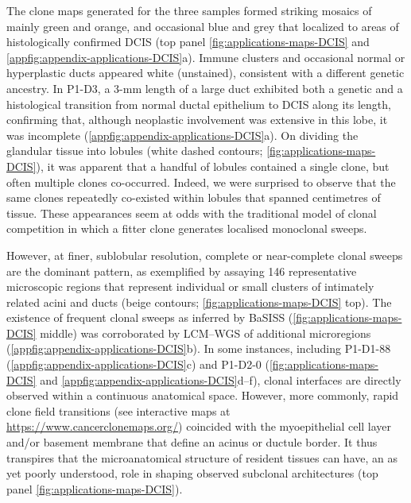 The clone maps generated for the three samples formed striking mosaics of mainly green and orange, and occasional blue and grey that localized to areas of histologically confirmed \ac{DCIS} (top panel \cref{fig:applications-maps-DCIS} and \cref{appfig:appendix-applications-DCIS}a). Immune clusters and occasional normal or hyperplastic ducts appeared white (unstained), consistent with a different genetic ancestry. In P1-D3, a 3-mm length of a large duct exhibited both a genetic and a histological transition from normal ductal epithelium to DCIS along its length, confirming that, although neoplastic involvement was extensive in this lobe, it was incomplete (\cref{appfig:appendix-applications-DCIS}a). On dividing the glandular tissue into lobules (white dashed contours; \cref{fig:applications-maps-DCIS}), it was apparent that a handful of lobules contained a single clone, but often multiple clones co-occurred. Indeed, we were surprised to observe that the same clones repeatedly co-existed within lobules that spanned centimetres of tissue. These appearances seem at odds with the traditional model of clonal competition in which a fitter clone generates localised monoclonal sweeps.


However, at finer, sublobular resolution, complete or near-complete clonal sweeps are the dominant pattern, as exemplified by assaying 146 representative microscopic regions that represent individual or small clusters of intimately related acini and ducts (beige contours; \cref{fig:applications-maps-DCIS} top). The existence of frequent clonal sweeps as inferred by BaSISS (\cref{fig:applications-maps-DCIS} middle) was corroborated by \ac{LCM}–\ac{WGS} of additional microregions (\cref{appfig:appendix-applications-DCIS}b). In some instances, including P1-D1-88 (\cref{appfig:appendix-applications-DCIS}c) and P1-D2-0 (\cref{fig:applications-maps-DCIS} and \cref{appfig:appendix-applications-DCIS}d–f), clonal interfaces are directly observed within a continuous anatomical space. However, more commonly, rapid clone field transitions (see interactive maps at \href{https://www.cancerclonemaps.org/}{https://www.cancerclonemaps.org/}) coincided with the myoepithelial cell layer and/or basement membrane that define an acinus or ductule border. It thus transpires that the microanatomical structure of resident tissues can have, an as yet poorly understood, role in shaping observed subclonal architectures (top panel \cref{fig:applications-maps-DCIS}).

